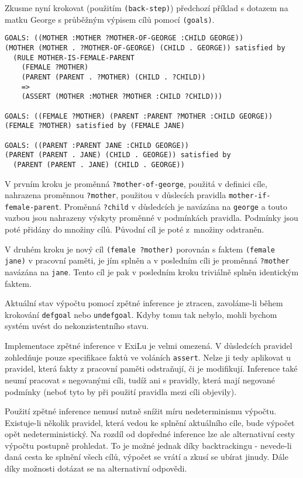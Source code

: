 Zkusme nyní krokovat (použitím \verb|(back-step)|) předchozí příklad s dotazem na
matku George s průběžným výpisem cílů pomocí \verb|(goals)|.
\begin{verbatim}
GOALS: ((MOTHER :MOTHER ?MOTHER-OF-GEORGE :CHILD GEORGE))
(MOTHER (MOTHER . ?MOTHER-OF-GEORGE) (CHILD . GEORGE)) satisfied by
  (RULE MOTHER-IS-FEMALE-PARENT
    (FEMALE ?MOTHER)
    (PARENT (PARENT . ?MOTHER) (CHILD . ?CHILD))
    =>
    (ASSERT (MOTHER :MOTHER ?MOTHER :CHILD ?CHILD)))

GOALS: ((FEMALE ?MOTHER) (PARENT :PARENT ?MOTHER :CHILD GEORGE))
(FEMALE ?MOTHER) satisfied by (FEMALE JANE)

GOALS: ((PARENT :PARENT JANE :CHILD GEORGE))
(PARENT (PARENT . JANE) (CHILD . GEORGE)) satisfied by
  (PARENT (PARENT . JANE) (CHILD . GEORGE))
\end{verbatim}
V prvním kroku je proměnná \verb|?mother-of-george|, použitá v definici cíle,
nahrazena proměnnou \verb|?mother|, použitou v důslecích pravidla
\verb|mother-if-female-parent|. Proměnná \verb|?child| v důsledcích je navázána
na \verb|george| a touto vazbou jsou nahrazeny výskyty proměnné v podmínkách
pravidla. Podmínky jsou poté přidány do množiny cílů. Původní cíl je poté
z~množiny odstraněn.

V druhém kroku je nový cíl \verb|(female ?mother)| porovnán s faktem
\verb|(female jane)| v pracovní paměti, je jím splněn a v posledním cíli je
proměnná \verb|?mother| navázána na \verb|jane|. Tento cíl je pak
v posledním kroku triviálně splněn identickým faktem.

Aktuální stav výpočtu pomocí zpětné inference je ztracen, zavoláme-li během
krokování \verb|defgoal| nebo \verb|undefgoal|. Kdyby tomu tak nebylo, mohli
bychom systém uvést do nekonzistentního stavu.

Implementace zpětné inference v ExiLu je velmi omezená. V důsledcích pravidel
zohledňuje pouze specifikace faktů ve voláních \verb|assert|. Nelze ji tedy
aplikovat u pravidel, která fakty z pracovní paměti odstraňují, či je
modifikují. Inference také neumí pracovat s negovanými cíli, tudíž ani s
pravidly, která mají negované podmínky (neboť tyto by při použití pravidla
mezi cíli objevily).

Použití zpětné inference nemusí nutně snížit míru nedeterminismu výpočtu.
Existuje-li několik pravidel, která vedou ke splnění aktuálního cíle, bude
výpočet opět nedeterministický. Na rozdíl od dopředné inference lze ale
alternativní cesty výpočtu postupně prohledat. To je možné jednak díky
backtrackingu - nevede-li daná cesta ke splnění všech cílů, výpočet se vrátí a
zkusí se ubírat jinudy. Dále díky možnosti dotázat se na alternativní odpovědi.
